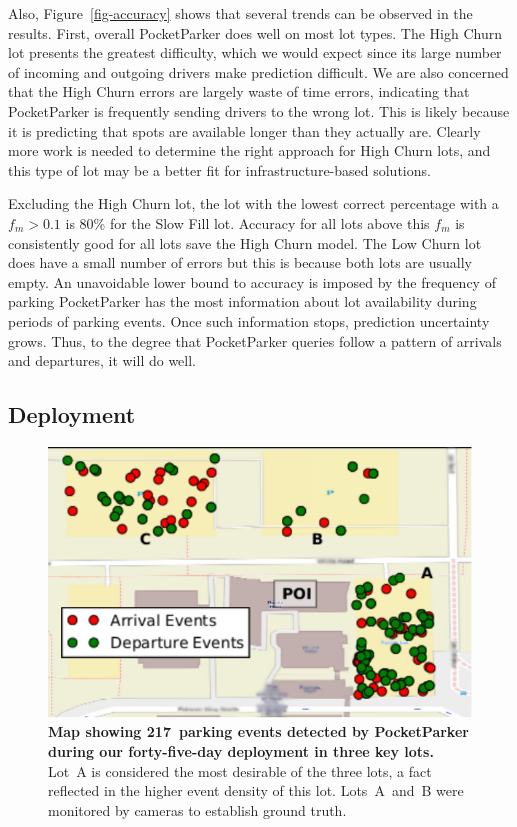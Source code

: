 Also, Figure~\ref{fig-accuracy} shows that several trends can be observed in
the results. First, overall PocketParker does well on most lot types. The
High Churn lot presents the greatest difficulty, which we would expect since
its large number of incoming and outgoing drivers make prediction difficult.
We are also concerned that the High Churn errors are largely waste of time
errors, indicating that PocketParker is frequently sending drivers to the
wrong lot. This is likely because it is predicting that spots are available
longer than they actually are. Clearly more work is needed to determine the
right approach for High Churn lots, and this type of lot may be a better fit
for infrastructure-based solutions.

Excluding the High Churn lot, the lot with the lowest correct percentage with
a $f_m > 0.1$ is 80\% for the Slow Fill lot.  Accuracy for all lots above
this $f_m$ is consistently good for all lots save the High Churn model.  The
Low Churn lot does have a small number of errors but this is because both
lots are usually empty. An unavoidable lower bound to accuracy is imposed by
the frequency of parking PocketParker has the most information about lot
availability during periods of parking events. Once such information stops,
prediction uncertainty grows. Thus, to the degree that PocketParker queries
follow a pattern of arrivals and departures, it will do well.

\newpage

\subsection{Deployment}

\begin{figure}
\centering
\includegraphics[trim=0 0 0 1mm,clip, width=\columnwidth]{./figures/smallEventsOnThreeParkingLot-anon.pdf}

\caption{\textbf{Map showing 217~parking events detected by PocketParker
during our forty-five-day deployment in three key lots.} Lot~A is considered
the most desirable of the three lots, a fact reflected in the higher event
density of this lot.  Lots~A~and~B were monitored by cameras to establish
ground truth.}

\label{fig-events}
\end{figure}

